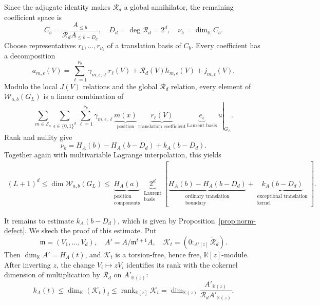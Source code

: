 \documentclass[11pt,reqno]{amsart}
\newcommand\K{\ensuremath{\mathbb{K}}}
\theoremstyle{definition}
\theoremstyle{plain}
\numberwithin{equation}{section}
\begin{document}
Since the adjugate
identity makes $\mathcal R_d$ a global annihilator, the remaining
coefficient space is
\begin{equation*}
    C_b=
    \frac{A_{\leq b}}{\mathcal R_dA_{\leq b-D_d}},
    \quad
    D_d=\deg\mathcal R_d=2^d,
    \quad
    \nu_b=\dim_\K C_b.
\end{equation*}
Choose representatives $r_1,\ldots,r_{\nu_b}$ of a translation basis of $C_b$. Every coefficient has a decomposition
\begin{equation*}
    a_{m,\epsilon}(V)=\sum_{\ell=1}^{\nu_b} \gamma_{m,\epsilon,\ell}r_\ell (V)+\mathcal{R}_d(V)h_{m,\epsilon}(V)+j_{m,\epsilon}(V).
\end{equation*}
Modulo the local $J(V)$ relations and the global $\mathcal R_d$
relation, every element of $\mathcal W_{a,b}(G_L)$ is a linear
combination of
\begin{equation*}
    \left.
    \sum_{m\in\mathcal S_a}
    \sum_{\epsilon\in\{0,1\}^d}
    \sum_{\ell=1}^{\nu_b}
    \gamma_{m,\epsilon,\ell}
    \underbrace{m(x)}_{\text{position}}\,
    \underbrace{r_\ell(V)}_{\text{translation coefficient}}\,
    \underbrace{e_\epsilon}_{\text{Laurent basis}}\,
    u
    \right|_{G_L}.
\end{equation*}
Rank and nullity give
\begin{equation*}
    \nu_b=
    H_A(b)-H_A(b-D_d)
    +
    k_A(b-D_d).
\end{equation*}
Together again with multivariable Lagrange interpolation, this yields
\begin{equation}\label{eq:overview-full-ineq}
\begin{aligned}
    (L+1)^d
    \le \dim\mathcal W_{a,b}(G_L)\le \underbrace{H_A(a)}_{\substack{\text{position}\\\text{components}}}
    \underbrace{2^d}_{\substack{\text{Laurent}\\\text{basis}}}
    \left[
        \underbrace{H_A(b)-H_A(b-D_d)}
        _{\substack{\text{ordinary translation}\\\text{boundary}}}
        +
        \underbrace{k_A(b-D_d)}
        _{\substack{\text{exceptional translation}\\\text{kernel}}}
    \right].
\end{aligned}
\end{equation}

It remains to estimate $k_A(b-D_d)$, which is given by
Proposition~\ref{prop:norm-defect}. We skech the proof of this estimate. Put
\begin{equation*}
    \mathfrak m=(V_1,\ldots,V_d),\quad
    A'=A/\mathfrak m^{t+1}A,\quad
    \mathcal K_t=
    \left(0:_{A'[z]}\widetilde{\mathcal R}_d\right).
\end{equation*}
Then $\dim_\K A'=H_A(t)$, and $\mathcal K_t$ is a torsion-free,
hence free, $\K[z]$-module. After inverting $z$, the change
$V_i\mapsto zV_i$ identifies its rank with the cokernel dimension
of multiplication by $\mathcal R_d$ on $A'_{\K(z)}$:
\begin{equation*}
    k_A(t)
    \leq
    \dim_\K(\mathcal K_t)_t
    \leq
    \operatorname{rank}_{\K[z]}\mathcal K_t
    =
    \dim_{\K(z)}
    \frac{A'_{\K(z)}}{\mathcal R_dA'_{\K(z)}}.
\end{equation*}
\end{document}
